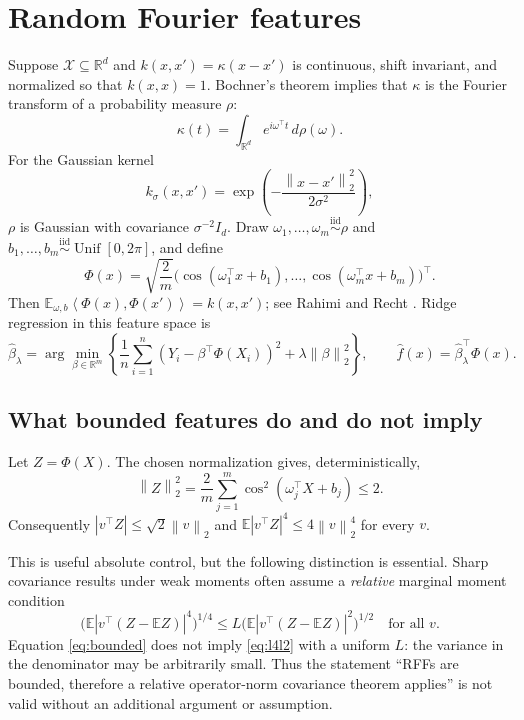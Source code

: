 \documentclass[11pt]{article}
\newcommand{\R}{\mathbb{R}}
\newcommand{\E}{\mathbb{E}}
\newcommand{\norm}[1]{\left\lVert #1\right\rVert}
\newcommand{\ip}[2]{\left\langle #1,#2\right\rangle}
\begin{document}
\section{Random Fourier features}

Suppose $\mathcal X\subseteq\R^d$ and $k(x,x')=\kappa(x-x')$ is continuous,
shift invariant, and normalized so that $k(x,x)=1$.  Bochner's theorem implies
that $\kappa$ is the Fourier transform of a probability measure $\rho$:
\[
 \kappa(t)=\int_{\R^d} e^{i\omega^\top t}\,d\rho(\omega).
\]
For the Gaussian kernel
\[
 k_\sigma(x,x')=\exp\!\left(-\frac{\norm{x-x'}_2^2}{2\sigma^2}\right),
\]
$\rho$ is Gaussian with covariance $\sigma^{-2}I_d$.  Draw
$\omega_1,\ldots,\omega_m\stackrel{\mathrm{iid}}\sim\rho$ and
$b_1,\ldots,b_m\stackrel{\mathrm{iid}}\sim\operatorname{Unif}[0,2\pi]$, and
define
\begin{equation}\label{eq:rff}
 \Phi(x)=\sqrt{\frac{2}{m}}
 \bigl(\cos(\omega_1^\top x+b_1),\ldots,
       \cos(\omega_m^\top x+b_m)\bigr)^\top.
\end{equation}
Then $\E_{\omega,b}\ip{\Phi(x)}{\Phi(x')}=k(x,x')$; see Rahimi and Recht
\cite{rahimi2007}.  Ridge regression in this feature space is
\begin{equation}\label{eq:rff-ridge}
 \widehat\beta_\lambda=\arg\min_{\beta\in\R^m}
 \left\{\frac1n\sum_{i=1}^n(Y_i-\beta^\top\Phi(X_i))^2
 +\lambda\norm{\beta}_2^2\right\},
 \qquad \widehat f(x)=\widehat\beta_\lambda^\top\Phi(x).
\end{equation}

\subsection{What bounded features do and do not imply}

Let $Z=\Phi(X)$.  The chosen normalization gives, deterministically,
\begin{equation}\label{eq:bounded}
 \norm{Z}_2^2=\frac{2}{m}\sum_{j=1}^m
 \cos^2(\omega_j^\top X+b_j)\leq 2.
\end{equation}
Consequently $|v^\top Z|\leq\sqrt2\norm v_2$ and
$\E|v^\top Z|^4\leq4\norm v_2^4$ for every $v$.

This is useful absolute control, but the following distinction is essential.
Sharp covariance results under weak moments often assume a \emph{relative}
marginal moment condition
\begin{equation}\label{eq:l4l2}
 \bigl(\E|v^\top(Z-\E Z)|^4\bigr)^{1/4}
 \leq L\bigl(\E|v^\top(Z-\E Z)|^2\bigr)^{1/2}
 \quad\text{for all }v.
\end{equation}
Equation \eqref{eq:bounded} does not imply \eqref{eq:l4l2} with a uniform $L$:
the variance in the denominator may be arbitrarily small.  Thus the statement
``RFFs are bounded, therefore a relative operator-norm covariance theorem
applies'' is not valid without an additional argument or assumption.
\end{document}
